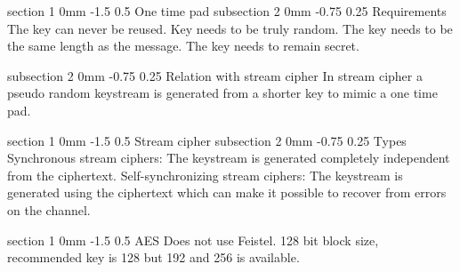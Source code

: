\documentclass[a4paper,11pt]{article}
\makeatletter
\renewcommand{\section}{\@startsection
   {section}%
   {1}%
   {0mm}%
   {-1.5\baselineskip}%
   {0.5\baselineskip}%
   {\sffamily\bfseries\upshape\normalsize}}%
\renewcommand{\subsection}{\@startsection
   {subsection}%
   {2}%
   {0mm}%
   {-0.75\baselineskip}%
   {0.25\baselineskip}%
   {\rmfamily\normalfont\slshape\normalsize}}%
\makeatother
\begin{document}
\section{One time pad}
\subsection{Requirements}
The key can never be reused. Key needs to be truly random. The key needs to be the same length as the message. The key needs to remain secret.

\subsection{Relation with stream cipher}
In stream cipher a pseudo random keystream is generated from a shorter key to mimic a one time pad. 

\section{Stream cipher}
\subsection{Types}
Synchronous stream ciphers: The keystream is generated completely independent from the ciphertext.
\newline
\newline
Self-synchronizing stream ciphers: The keystream is generated using the ciphertext which can make it possible to recover from errors on the channel.

\section{AES}
Does not use Feistel. 128 bit block size, recommended key is 128 but 192 and 256 is available.
\end{document}
